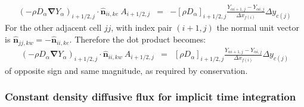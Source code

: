 \documentclass[12pt]{article}
\begin{document}
%
\begin{eqnarray}
   \left( - \rho D_\alpha \boldsymbol{\nabla} Y_\alpha \right)_{i+1/2,j} \cdot \hat{\mathbf{n}}_{ii,ke} \: A_{i+1/2,j} & = &
   -[\rho D_\alpha]_{i+1/2,j} \frac{Y_{\alpha i+1,j}-Y_{ \alpha i,j}}{\Delta x_{f(i)}} \Delta y_{c(j)} \label{eq:diffii}
\end{eqnarray}
%
For the other adjacent cell $jj$, with index pair $(i+1,j)$ the normal unit vector is $\hat{\mathbf{n}}_{jj,kw}=-\hat{\mathbf{n}}_{ii,ke}$. Therefore the dot product becomes:
%
\begin{eqnarray}
   \left( - \rho D_\alpha \boldsymbol{\nabla} Y_\alpha \right)_{i+1/2,j} \cdot \hat{\mathbf{n}}_{ii,kw} \: A_{i+1/2,j} & = &
   [\rho D_\alpha]_{i+1/2,j} \frac{Y_{\alpha i+1,j}-Y_{ \alpha i,j}}{\Delta x_{f(i)}} \Delta y_{c(j)} \label{eq:diffjj}
\end{eqnarray}
%
of opposite sign and same magnitude, as required by conservation.


\subsubsection*{Constant density diffusive flux for implicit time integration}
\end{document}
